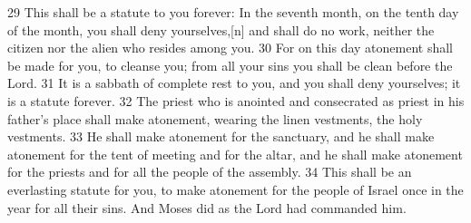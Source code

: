 29 This shall be a statute to you forever: In the seventh month, on the tenth 
day of the month, you shall deny yourselves,[n] and shall do no work, neither 
the citizen nor the alien who resides among you. 30 For on this day atonement 
shall be made for you, to cleanse you; from all your sins you shall be clean 
before the Lord. 31 It is a sabbath of complete rest to you, and you shall deny
yourselves; it is a statute forever. 32 The priest who is anointed and 
consecrated as priest in his father’s place shall make atonement, wearing the 
linen vestments, the holy vestments. 33 He shall make atonement for the sanctuary, 
and he shall make atonement for the tent of meeting and for the altar, and he 
shall make atonement for the priests and for all the people of the assembly. 
34 This shall be an everlasting statute for you, to make atonement for the 
people of Israel once in the year for all their sins. And Moses did as the Lord
had commanded him.
